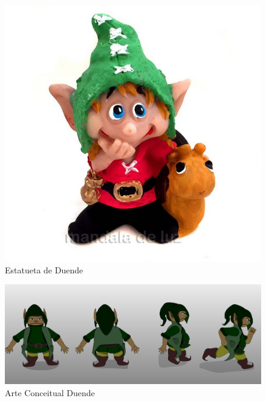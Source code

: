 \begin{figure}[htb]
	\caption{\label{duendeRef}Estatueta de Duende}
	\begin{center}
	    \includegraphics[width=\textwidth/2]{imagens/duendeRef.jpg}
	\end{center}
\end{figure}



\begin{figure}[htb]
	\caption{\label{duendePos}Arte Conceitual Duende}
	\begin{center}
	    \includegraphics[width=\textwidth]{imagens/duendePosicoes.jpeg}
	\end{center}
\end{figure}

